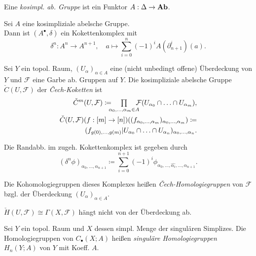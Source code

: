 \documentclass{cheat-sheet}
\newcommand{\nspace}[1]{\foreach \i in {1,...,#1}{ \! }} %
\newcommand{\CC}[1]{{#1}_{\bullet}} %
\newcommand{\Fais}{\mathcal{F}} %
\begin{document}
\begin{defn}
  Eine \emph{kosimpl. ab. Gruppe} ist ein Funktor
  $A : \Delta \to \mathbf{Ab}$.
\end{defn}

\begin{defn}
  Sei $A$ eine kosimpliziale abelsche Gruppe. \\
  Dann ist $(A^\bullet, \delta)$ ein Kokettenkomplex mit
  \[
    \delta^n : A^n \to A^{n+1}, \quad
    a \mapsto \sum_{i=0}^n (-1)^i A(\partial_{n+1}^i)(a).
  \]
\end{defn}


\begin{defn}
  Sei $Y$ ein topol. Raum, $(U_\alpha)_{\alpha \in A}$ eine (nicht unbedingt offene) Überdeckung von $Y$ und $\Fais$ eine Garbe ab. Gruppen auf $Y$. Die kosimpliziale abelsche Gruppe $\check{C}(U, \Fais)$ der \emph{Čech-Koketten} ist
  \begin{align*}
    \check{C}^m(U, \Fais) \coloneqq \nspace{4} \prod_{\alpha_0, \ldots, \alpha_m \in A} \nspace{4} \Fais(U_{\alpha_0} \cap \ldots \cap U_{\alpha_m}), \\
    \check{C}(U, \Fais)(f : [m] \to [n])((f_{\alpha_0, \ldots ,\alpha_m})_{\alpha_0, \ldots, \alpha_m}) \coloneqq \\
    (f_{g(0), \ldots, g(m)}|U_{\alpha_0} \cap \ldots \cap U_{\alpha_n})_{\alpha_0, \nldots, \alpha_n}.
  \end{align*}
\end{defn}

\begin{bem}
  Die Randabb. im zugeh. Kokettenkomplex ist gegeben durch
  \[ (\delta^n \phi)_{\alpha_0, \ldots, \alpha_{n+1}} \coloneqq \sum_{i=0}^{n+1} (-1)^i \phi_{\alpha_0, \ldots, \hat{\alpha_i}, \ldots, \alpha_{n+1}}. \]
\end{bem}

\begin{defn}
  Die Kohomologiegruppen dieses Komplexes heißen \emph{Čech-Homologiegruppen} von $\Fais$ bzgl. der Überdeckung $(U_\alpha)_{\alpha \in A}$.
\end{defn}

\begin{bem}
  $\check{H}(U, \Fais) \cong \Gamma(X, \Fais)$ hängt nicht von der Überdeckung ab.
\end{bem}

\begin{defn}
  Sei $Y$ ein topol. Raum und $X$ dessen simpl. Menge der singulären Simplizes.
  Die Homologiegruppen von $\CC{C}(X; A)$ heißen \emph{singuläre Homologiegruppen} $H_n(Y; A)$ von $Y$ mit Koeff. $A$.
\end{defn}
\end{document}
